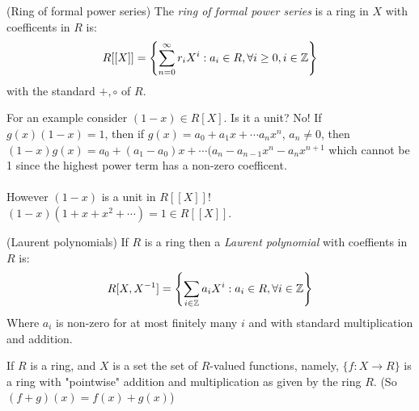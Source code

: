 \documentclass{article}
\begin{document}
\begin{itemize}
\begin{definition}
	(Ring of formal power series) The \textit{ring of formal power series} is a ring in $ X $ with coefficents in $ R $ is:
	\[
	R[[X]]=\left\{\sum_{n=0}^\infty r_iX^i:a_i\in R,\forall i\ge 0, i\in\mathbb{Z}\right\}
	\]
	with the standard $ +,\circ $ of $ R $.
\end{definition}
For an example consider $ (1-x)\in R[X] $. Is it a unit? No! If $ g(x)(1-x)=1 $, then if $ g(x)=a_0+a_1x+\cdots a_nx^n $, $ a_n\ne 0 $, then $ (1-x)g(x) = a_0 + (a_1-a_0)x+\cdots (a_n-a_{n-1}x^n-a_nx^{n+1} $ which cannot be 1 since the highest power term has a non-zero coefficent.\\\\
However $ (1-x) $ is a unit in $ R[[X]] $! $ (1-x)(1+x+x^2+\cdots)=1\in R[[X]] $.\\
\begin{definition}
	(Laurent polynomials) If $ R $ is a ring then a \textit{Laurent polynomial} with coeffients in $ R $ is:
	\[
		R[X,{X}^{-1}] = \left\{\sum_{i\in\mathbb{Z}}a_iX^i: a_i\in R,\forall i\in\mathbb{Z}\right\}
	\]
	Where $ a_i $ is non-zero for at most finitely many $ i $ and with standard multiplication and addition.
\end{definition}

If $ R $ is a ring, and $ X $ is a set the set of $ R $-valued functions, namely, $ \{f:X\to R\} $ is a ring with "pointwise" addition and multiplication as given by the ring $ R $. (So $ (f+g)(x)=f(x)+g(x) $)

\end{itemize}
\end{document}
